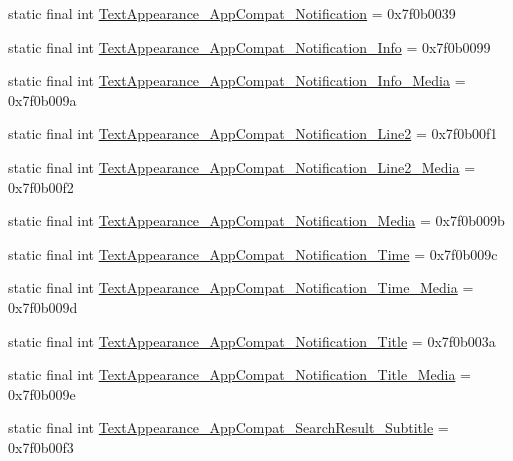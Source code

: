 \begin{CompactItemize}
static final int \hyperlink{classandroid_1_1support_1_1graphics_1_1drawable_1_1_r_1_1style_7b415f16a4f343c09cf452c20e20f285}{TextAppearance\_\-AppCompat\_\-Notification} = 0x7f0b0039
\item 
static final int \hyperlink{classandroid_1_1support_1_1graphics_1_1drawable_1_1_r_1_1style_b8c61039223e02d10a695214877b0e3e}{TextAppearance\_\-AppCompat\_\-Notification\_\-Info} = 0x7f0b0099
\item 
static final int \hyperlink{classandroid_1_1support_1_1graphics_1_1drawable_1_1_r_1_1style_824f3e2252964c29f589a1e6ac96f665}{TextAppearance\_\-AppCompat\_\-Notification\_\-Info\_\-Media} = 0x7f0b009a
\item 
static final int \hyperlink{classandroid_1_1support_1_1graphics_1_1drawable_1_1_r_1_1style_c07f6f97b28e01d2af3b26f006f88193}{TextAppearance\_\-AppCompat\_\-Notification\_\-Line2} = 0x7f0b00f1
\item 
static final int \hyperlink{classandroid_1_1support_1_1graphics_1_1drawable_1_1_r_1_1style_e0d990eb2e080e2c6abc3be0fb1f0b74}{TextAppearance\_\-AppCompat\_\-Notification\_\-Line2\_\-Media} = 0x7f0b00f2
\item 
static final int \hyperlink{classandroid_1_1support_1_1graphics_1_1drawable_1_1_r_1_1style_5e7bed65c17ee354ea8d6f76e025a2b7}{TextAppearance\_\-AppCompat\_\-Notification\_\-Media} = 0x7f0b009b
\item 
static final int \hyperlink{classandroid_1_1support_1_1graphics_1_1drawable_1_1_r_1_1style_64653465b322f7de27acfedca93625f4}{TextAppearance\_\-AppCompat\_\-Notification\_\-Time} = 0x7f0b009c
\item 
static final int \hyperlink{classandroid_1_1support_1_1graphics_1_1drawable_1_1_r_1_1style_37415ef88221a8b90ec087b135c6b9e5}{TextAppearance\_\-AppCompat\_\-Notification\_\-Time\_\-Media} = 0x7f0b009d
\item 
static final int \hyperlink{classandroid_1_1support_1_1graphics_1_1drawable_1_1_r_1_1style_c9ea00561a37e337b974084b42487193}{TextAppearance\_\-AppCompat\_\-Notification\_\-Title} = 0x7f0b003a
\item 
static final int \hyperlink{classandroid_1_1support_1_1graphics_1_1drawable_1_1_r_1_1style_1718a9a7349c824a7d883d245c84d7e7}{TextAppearance\_\-AppCompat\_\-Notification\_\-Title\_\-Media} = 0x7f0b009e
\item 
static final int \hyperlink{classandroid_1_1support_1_1graphics_1_1drawable_1_1_r_1_1style_adb9eb65f9613eb99a4bff4d0eeefb5c}{TextAppearance\_\-AppCompat\_\-SearchResult\_\-Subtitle} = 0x7f0b00f3

\end{CompactItemize}
